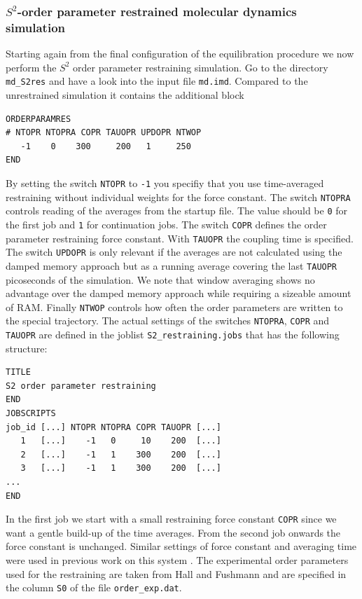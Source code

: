 \subsubsection{$S^2$-order parameter restrained molecular dynamics simulation}

Starting again from the final configuration of the equilibration procedure we now perform the $S^2$ order parameter restraining simulation. Go to the directory \texttt{md\_S2res} and have a look into the input file \texttt{md.imd}. 
Compared to the unrestrained simulation it contains the additional block 

\begin{lstlisting}
ORDERPARAMRES
# NTOPR NTOPRA COPR TAUOPR UPDOPR NTWOP
   -1    0    300     200   1     250
END
\end{lstlisting}
By setting the switch \texttt{NTOPR} to \texttt{-1} you specifiy that you use time-averaged restraining without individual weights for the force constant. The switch \texttt{NTOPRA} controls reading of the 
averages from the startup file. The value should be \texttt{0} for the first job and \texttt{1} for continuation jobs. The switch \texttt{COPR} defines the order parameter restraining force constant. With 
\texttt{TAUOPR} the coupling time is specified. The switch \texttt{UPDOPR} is only relevant if the averages are not calculated using the damped memory approach but as a running average covering the 
last \texttt{TAUOPR} picoseconds of the simulation. We note that window averaging shows no advantage over the damped memory approach while requiring a sizeable amount of RAM. Finally \texttt{NTWOP}
controls how often the order parameters are written to the special trajectory. 
The actual settings of the switches \texttt{NTOPRA}, \texttt{COPR} and \texttt{TAUOPR} are defined in the joblist \texttt{S2\_restraining.jobs} that has the following structure: 
\begin{lstlisting}
TITLE
S2 order parameter restraining
END
JOBSCRIPTS
job_id [...] NTOPR NTOPRA COPR TAUOPR [...]
   1   [...]    -1   0     10    200  [...]   
   2   [...]    -1   1    300    200  [...] 
   3   [...]    -1   1    300    200  [...] 
... 
END
\end{lstlisting}
In the first job we start with a small restraining force constant \texttt{COPR} since we want a gentle build-up of the time averages. From the second job onwards the force constant is unchanged. Similar settings of force constant and averaging time were used in previous work on this system \cite{Hansen_S2_2014}.
The experimental order parameters used for the restraining are taken from Hall and Fushmann \cite{Hall_2003} and are specified in the column \texttt{S0} of the file \texttt{order\_exp.dat}.
